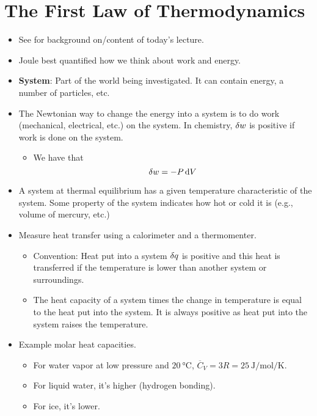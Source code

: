\documentclass[../notes.tex]{subfiles}
\begin{document}
\section{The First Law of Thermodynamics}
\begin{itemize}
    \item {}See \textcite{bib:PHYS13300Notes} for background on/content of today's lecture.
    \item Joule best quantified how we think about work and energy.
    \item \textbf{System}: Part of the world being investigated. It can contain energy, a number of particles, etc.
    \item The Newtonian way to change the energy into a system is to do work (mechanical, electrical, etc.) on the system. In chemistry, $\var{w}$ is positive if work is done on the system.
    \begin{itemize}
        \item We have that
        \begin{equation*}
            \var{w} = -P\dd{V}
        \end{equation*}
    \end{itemize}
    \item A system at thermal equilibrium has a given temperature characteristic of the system. Some property of the system indicates how hot or cold it is (e.g., volume of mercury, etc.)
    \item Measure heat transfer using a calorimeter and a thermomenter.
    \begin{itemize}
        \item Convention: Heat put into a system $\var{q}$ is positive and this heat is transferred if the temperature is lower than another system or surroundings.
        \item The heat capacity of a system times the change in temperature is equal to the heat put into the system. It is always positive as heat put into the system raises the temperature.
    \end{itemize}
    \item Example molar heat capacities.
    \begin{itemize}
        \item For water vapor at low pressure and $\SI{20}{\celsius}$, $\overline{C}_V=3R=\SI{25}{\joule\per\mole\per\kelvin}$.
        \item For liquid water, it's higher (hydrogen bonding).
        \item For ice, it's lower.

\end{itemize}
\end{itemize}
\end{document}
